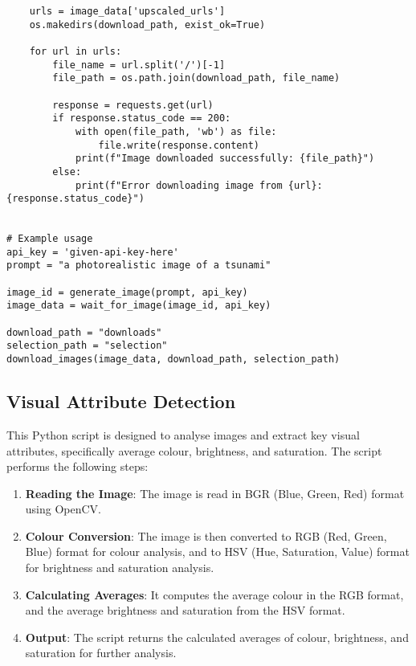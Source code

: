 \begin{lstlisting}
    urls = image_data['upscaled_urls']
    os.makedirs(download_path, exist_ok=True)

    for url in urls:
        file_name = url.split('/')[-1]
        file_path = os.path.join(download_path, file_name)

        response = requests.get(url)
        if response.status_code == 200:
            with open(file_path, 'wb') as file:
                file.write(response.content)
            print(f"Image downloaded successfully: {file_path}")
        else:
            print(f"Error downloading image from {url}: {response.status_code}")


# Example usage
api_key = 'given-api-key-here'
prompt = "a photorealistic image of a tsunami"

image_id = generate_image(prompt, api_key)
image_data = wait_for_image(image_id, api_key)

download_path = "downloads"
selection_path = "selection"
download_images(image_data, download_path, selection_path)

\end{lstlisting}



\subsection{Visual Attribute Detection}

This Python script is designed to analyse images and extract key visual attributes, specifically average colour, brightness, and saturation. The script performs the following steps:

\begin{enumerate}
    \item \textbf{Reading the Image}: The image is read in BGR (Blue, Green, Red) format using OpenCV.
    \item \textbf{Colour Conversion}: The image is then converted to RGB (Red, Green, Blue) format for colour analysis, and to HSV (Hue, Saturation, Value) format for brightness and saturation analysis.
    \item \textbf{Calculating Averages}: It computes the average colour in the RGB format, and the average brightness and saturation from the HSV format.
    \item \textbf{Output}: The script returns the calculated averages of colour, brightness, and saturation for further analysis.
\end{enumerate}

